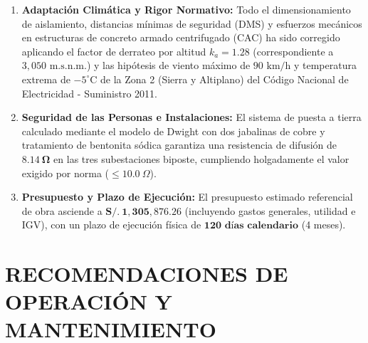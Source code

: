 \begin{enumerate}
  \item \textbf{Adaptación Climática y Rigor Normativo:} Todo el dimensionamiento de aislamiento, distancias mínimas de seguridad (DMS) y esfuerzos mecánicos en estructuras de concreto armado centrifugado (CAC) ha sido corregido aplicando el factor de derrateo por altitud $k_a = 1.28$ (correspondiente a $3,050\text{ m.s.n.m.}$) y las hipótesis de viento máximo de $90\text{ km/h}$ y temperatura extrema de $-5^\circ\text{C}$ de la Zona 2 (Sierra y Altiplano) del Código Nacional de Electricidad - Suministro 2011.
  \item \textbf{Seguridad de las Personas e Instalaciones:} El sistema de puesta a tierra calculado mediante el modelo de Dwight con dos jabalinas de cobre y tratamiento de bentonita sódica garantiza una resistencia de difusión de $\mathbf{8.14\ \Omega}$ en las tres subestaciones biposte, cumpliendo holgadamente el valor exigido por norma ($\le 10.0\ \Omega$).
  \item \textbf{Presupuesto y Plazo de Ejecución:} El presupuesto estimado referencial de obra asciende a $\mathbf{S/.\ 1,305,876.26}$ (incluyendo gastos generales, utilidad e IGV), con un plazo de ejecución física de $\mathbf{120\text{ días calendario}}$ (4 meses).
\end{enumerate}

\section{RECOMENDACIONES DE OPERACIÓN Y MANTENIMIENTO}

